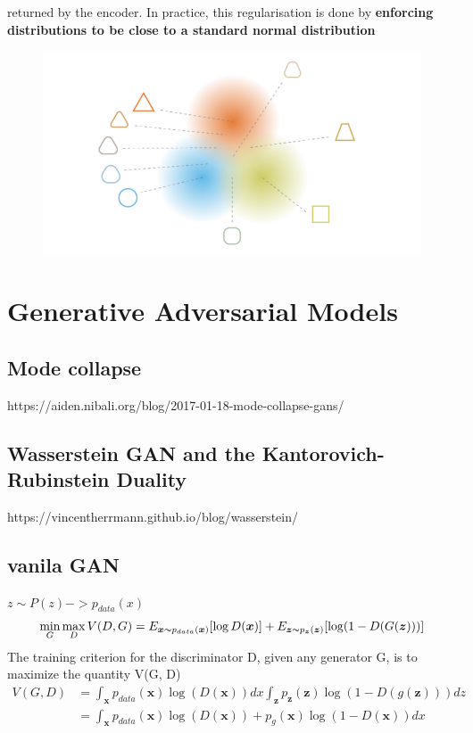 returned by the encoder. In practice, this regularisation is done by \textbf{enforcing
distributions to be close to a standard normal distribution}
\begin{figure}[H]
    \centering
    \includegraphics[width=12cm]{images/vae_regularisation.png}
    \label{fig:regularised_distributions_vae}
\end{figure}

\section{Generative Adversarial Models}

\subsection{Mode collapse}
https://aiden.nibali.org/blog/2017-01-18-mode-collapse-gans/

\subsection{Wasserstein GAN and the Kantorovich-Rubinstein Duality}
https://vincentherrmann.github.io/blog/wasserstein/

\subsection{vanila GAN}
$z \sim P(z) -> p_{data}(x)$
\begin{equation}
    \min_G \max_D V(D, G) = E_{\boldsymbol{x} \thicksim p_{data}(\boldsymbol{x})}[\log D(\boldsymbol{x})] + E_{\boldsymbol{z} \thicksim p_{\boldsymbol{z}}(\boldsymbol{z})}[\log (1 - D(G(\boldsymbol{z})))]
\end{equation}
The training criterion for the discriminator D, given any generator G, is to maximize the
quantity V(G, D)
\begin{equation}
    \begin{split}
        V(G, D) &= \int_{\boldsymbol{x}} p_{data}(\boldsymbol{x}) \log (D(\boldsymbol{x})) dx \int_{\boldsymbol{z}} p_{\boldsymbol{z}}(\boldsymbol{z}) \log(1 - D(g(\boldsymbol{z})))dz \\
        &= \int_{\boldsymbol{x}} p_{data}(\boldsymbol{x}) \log(D(\boldsymbol{x})) + p_g(\boldsymbol{x}) \log (1 - D(\boldsymbol{x})) dx
    \end{split}
\end{equation}

